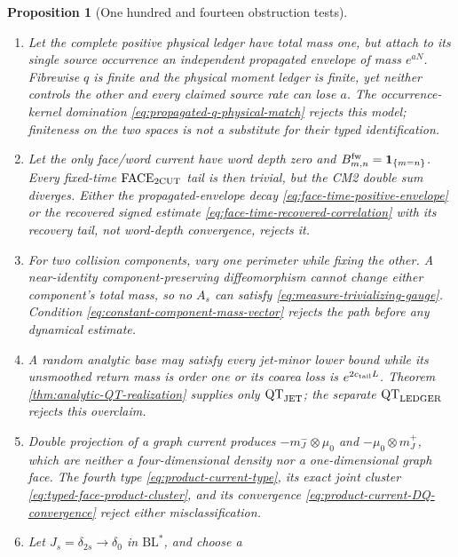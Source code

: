 \documentclass[11pt]{article}
\newtheorem{proposition}[theorem]{Proposition}
\newcommand{\one}{\mathbf 1}
\begin{document}
\begin{proposition}[One hundred and fourteen obstruction tests]
\begin{enumerate}[label=\textup{(T\arabic*)}]
      component choice is non-Borel.  Then neither the marked kernel nor
      Tonelli assembly is defined.  The standard-Borel measurable component
      extension in Definition~\ref{lem:measurable-positive-decomposition} rejects
      this model before any signed recombination.
\item Let the complete positive physical ledger have total mass one, but
      attach to its single source occurrence an independent propagated
      envelope of mass $e^{aN}$.  Fibrewise $q$ is finite and the physical
      moment ledger is finite, yet neither controls the other and every
      claimed source rate can lose $a$.  The occurrence-kernel domination
      \eqref{eq:propagated-q-physical-match} rejects this model; finiteness on
      the two spaces is not a substitute for their typed identification.
\item Let the only face/word current have word depth zero and
      $B_{m,n}^{\rm fw}=\one_{\{m=n\}}$.  Every fixed-time
      $\mathrm{FACE}_{\rm 2CUT}$ tail is then trivial, but the CM2 double sum
      diverges.  Either the propagated-envelope decay
      \eqref{eq:face-time-positive-envelope} or the recovered signed estimate
      \eqref{eq:face-time-recovered-correlation} with its recovery tail,
      not word-depth convergence, rejects it.
\item For two collision components, vary one perimeter while fixing the
      other.  A near-identity component-preserving diffeomorphism cannot
      change either component's total mass, so no $A_s$ can satisfy
      \eqref{eq:measure-trivializing-gauge}.  Condition
      \eqref{eq:constant-component-mass-vector} rejects the path before any
      dynamical estimate.
\item A random analytic base may satisfy every jet-minor lower bound while
      its unsmoothed return mass is order one or its coarea loss is
      $e^{2c_{\rm tail}L}$.  Theorem
      \ref{thm:analytic-QT-realization} supplies only
      $\mathrm{QT}_{\rm JET}$; the separate
      $\mathrm{QT}_{\rm LEDGER}$ rejects this overclaim.
\item Double projection of a graph current produces
      $-m_J^-\otimes\mu_0$ and $-\mu_0\otimes m_J^+$, which are neither a
      four-dimensional density nor a one-dimensional graph face.  The fourth
      type \eqref{eq:product-current-type}, its exact joint cluster
      \eqref{eq:typed-face-product-cluster}, and its convergence
      \eqref{eq:product-current-DQ-convergence} reject either
      misclassification.
\item Let $J_s=\delta_{2s}\to\delta_0$ in $\mathrm{BL}^*$, and choose a

\end{enumerate}
\end{proposition}
\end{document}
